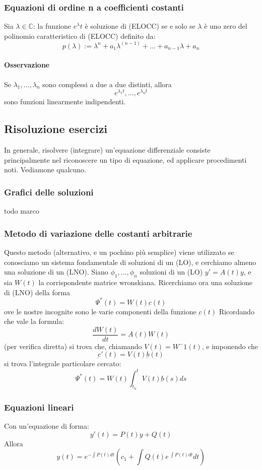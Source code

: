 \documentclass[a4paper,12pt]{article}
\begin{document}
\subsubsection{Equazioni di ordine n a coefficienti costanti}
Sia $\lambda \in \mathbb{C}$: la funzione $e^\lambda t$ è soluzione di (ELOCC) se e solo se $\lambda$ è uno zero del polinomio caratteristico di (ELOCC) definito da: $$ p(\lambda) := \lambda^n + a_1\lambda^{(n-1)}+ \dots +a_{n-1}\lambda+a_n$$
\paragraph*{Osservazione}
Se  $\lambda_1,\dots,\lambda_n$ sono complessi a due a due distinti, allora 
$$ e^{\lambda_1 t}, \dots ,e^{\lambda_n t}$$ sono funzioni linearmente indipendenti. 



\subsection{Risoluzione esercizi}
In generale, risolvere (integrare) un'equazione differenziale consiste principalmente nel riconoscere un tipo di equazione, ed applicare procedimenti noti. Vediamone qualcuno.

\subsubsection{Grafici delle soluzioni}
todo marco

\subsubsection{Metodo di variazione delle costanti arbitrarie}
Questo metodo (alternativo, e un pochino più semplice) viene utilizzato se conosciamo un sistema fondamentale di soluzioni di un (LO), e cerchiamo almeno una soluzione di un (LNO).
Siano $\phi_1,...,\phi_n$ soluzioni di un (LO) $y'= A(t)y$, e sia $W(t)$ la corrispondente matrice wronskiana.
Ricerchiamo ora una soluzione di (LNO) della forma
$$\Psi^*(t)=W(t)\underbar{c}(t)$$
ove le nostre incognite sono le varie componenti della funzione $\underbar{c}(t)$
Ricordando che vale la formula:
$$\frac{dW(t)}{dt} = A(t)W(t)$$
(per verifica diretta) si trova che, chiamando $V(t) = W^-1(t)$, e imponendo che $$\underbar{c}'(t) = V(t)\underbar{b}(t)$$
si trova l'integrale particolare cercato:
$$\Psi^*(t)= W(t)\int_{t_0}^t V(t)\underbar{b}(s) ds$$

\subsubsection{Equazioni lineari}
Con un'equazione di forma:
$$y'(t) = P(t)y+Q(t)$$
Allora
$$y(t)=e^{- \displaystyle\int P(t)dt}\left(c_1 + \int Q(t)e^{\ \displaystyle\int P(t)dt}dt\right)$$
\end{document}
